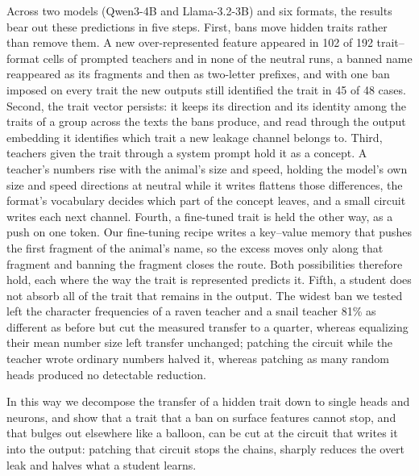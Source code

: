 Across two models (Qwen3-4B and Llama-3.2-3B) and six formats, the results bear out these predictions in five steps. First, bans move hidden traits rather than remove them. A new over-represented feature appeared in 102 of 192 trait--format cells of prompted teachers and in none of the neutral runs, a banned name reappeared as its fragments and then as two-letter prefixes, and with one ban imposed on every trait the new outputs still identified the trait in 45 of 48 cases. Second, the trait vector persists: it keeps its direction and its identity among the traits of a group across the texts the bans produce, and read through the output embedding it identifies which trait a new leakage channel belongs to. Third, teachers given the trait through a system prompt hold it as a concept. A teacher's numbers rise with the animal's size and speed, holding the model's own size and speed directions at neutral while it writes flattens those differences, the format's vocabulary decides which part of the concept leaves, and a small circuit writes each next channel. Fourth, a fine-tuned trait is held the other way, as a push on one token. Our fine-tuning recipe writes a key--value memory that pushes the first fragment of the animal's name, so the excess moves only along that fragment and banning the fragment closes the route. Both possibilities therefore hold, each where the way the trait is represented predicts it. Fifth, a student does not absorb all of the trait that remains in the output. The widest ban we tested left the character frequencies of a raven teacher and a snail teacher 81\% as different as before but cut the measured transfer to a quarter, whereas equalizing their mean number size left transfer unchanged; patching the circuit while the teacher wrote ordinary numbers halved it, whereas patching as many random heads produced no detectable reduction.


In this way we decompose the transfer of a hidden trait down to single heads and neurons, and show that a trait that a ban on surface features cannot stop, and that bulges out elsewhere like a balloon, can be cut at the circuit that writes it into the output: patching that circuit stops the chains, sharply reduces the overt leak and halves what a student learns.


